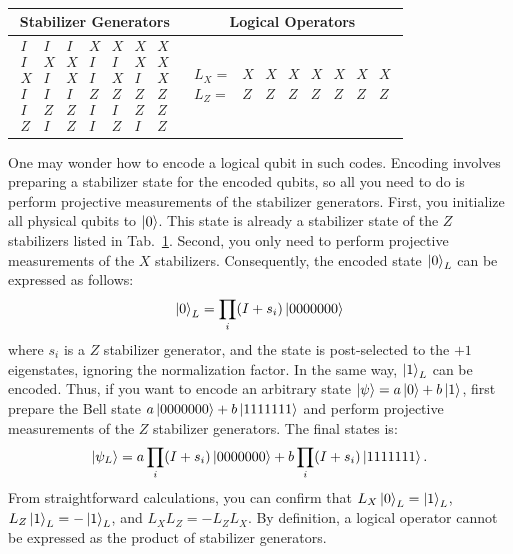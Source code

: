 \documentclass[a4paper,11pt]{ltjsarticle}
\begin{document}
{{{            \begin{table}[h]
                \centering
                \caption{ }
                \label{steane_code}
                \begin{tabular}{cc}
                    \hline
                    Stabilizer Generators & Logical Operators\\
                    \hline
                    {\setlength{\arraycolsep}{1pt}
                    $\begin{array}{ccccccc}
                        I&I&I&X&X&X&X\\
                        I&X&X&I&I&X&X\\
                        X&I&X&I&X&I&X\\
                        I&I&I&Z&Z&Z&Z\\
                        I&Z&Z&I&I&Z&Z\\
                        Z&I&Z&I&Z&I&Z
                    \end{array}$}&{\setlength{\arraycolsep}{1pt}
                    $\begin{array}{cccccccc}
                        L_X=&X&X&X&X&X&X&X\\
                        L_Z=&Z&Z&Z&Z&Z&Z&Z
                    \end{array}$}\\
                    \hline
                \end{tabular}
            \end{table}

            One may wonder how to encode a logical qubit in such codes. Encoding involves preparing a stabilizer state for the encoded qubits, so all you need to do is perform projective measurements of the stabilizer generators. First, you initialize all physical qubits to $\ket{0}$. This state is already a stabilizer state of the $Z$ stabilizers listed in Tab.~\ref{steane_code}. Second, you only need to perform projective measurements of the $X$ stabilizers. Consequently, the encoded state $\ket{0}_L$ can be expressed as follows:
            \begin{align*}
                \ket{0}_L=\prod_{i}(I+s_i)\ket{0000000}
            \end{align*}
            where $s_i$ is a $Z$ stabilizer generator, and the state is post-selected to the $+1$ eigenstates, ignoring the normalization factor. In the same way, $\ket{1}_L$ can be encoded. Thus, if you want to encode an arbitrary state $\ket{\psi} = a\ket{0} + b\ket{1}$, first prepare the Bell state $a\ket{0000000} + b\ket{1111111}$ and perform projective measurements of the $Z$ stabilizer generators. The final states is:
            \begin{align*}
                \ket{\psi_L}=a\prod_{i}(I+s_i)\ket{0000000}+b\prod_{i}(I+s_i)\ket{1111111}.
            \end{align*}
            From straightforward calculations, you can confirm that $L_X\ket{0}_L = \ket{1}_L$, $L_Z\ket{1}_L = -\ket{1}_L$, and $L_XL_Z = -L_ZL_X$. By definition, a logical operator cannot be expressed as the product of stabilizer generators.

}}}
\end{document}
